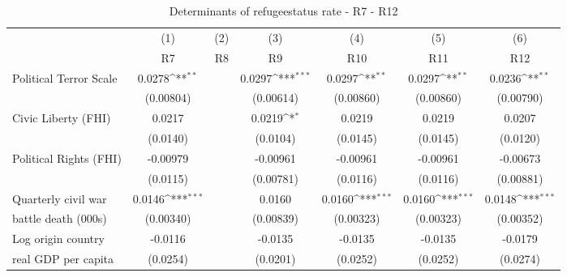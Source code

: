 \begin{table}[!ht]\centering \scriptsize
\def\sym#1{\ifmmode^{#1}\else\(^{#1}\)\fi}
\caption{Determinants of refugeestatus rate - R7 - R12}
\begin{tabular}{l*{6}{c}}
\hline\hline
	&\multicolumn{1}{c}{(1)}     &\multicolumn{1}{c}{(2)}       &\multicolumn{1}{c}{(3)}       &\multicolumn{1}{c}{(4)}    	&\multicolumn{1}{c}{(5)}  	&\multicolumn{1}{c}{(6)}   \\
                    &\multicolumn{1}{c}{R7}&\multicolumn{1}{c}{R8}&\multicolumn{1}{c}{R9}&\multicolumn{1}{c}{R10}&\multicolumn{1}{c}{R11}&\multicolumn{1}{c}{R12}\\    
\hline
Political Terror Scale&      0.0278\sym{**} &                     &      0.0297\sym{***}&      0.0297\sym{**} &      0.0297\sym{**} &      0.0236\sym{**} \\
                    &   (0.00804)         &                     &   (0.00614)         &   (0.00860)         &   (0.00860)         &   (0.00790)         \\
[0,5em]
Civic Liberty (FHI) &      0.0217         &                     &      0.0219\sym{*}  &      0.0219         &      0.0219         &      0.0207         \\
                    &    (0.0140)         &                     &    (0.0104)         &    (0.0145)         &    (0.0145)         &    (0.0120)         \\
[0,5em]
Political Rights (FHI)&    -0.00979         &                     &    -0.00961         &    -0.00961         &    -0.00961         &    -0.00673         \\
                    &    (0.0115)         &                     &   (0.00781)         &    (0.0116)         &    (0.0116)         &   (0.00881)         \\
[0,5em]
Quarterly civil war &      0.0146\sym{***}&                     &      0.0160         &      0.0160\sym{***}&      0.0160\sym{***}&      0.0148\sym{***}\\
battle death (000s)                    &   (0.00340)         &                     &   (0.00839)         &   (0.00323)         &   (0.00323)         &   (0.00352)         \\
[0,5em]
Log origin country&     -0.0116         &                     &     -0.0135         &     -0.0135         &     -0.0135         &     -0.0179         \\
 real GDP per capita                    &    (0.0254)         &                     &    (0.0201)         &    (0.0252)         &    (0.0252)         &    (0.0274)         \\

\end{tabular}
\end{table}
